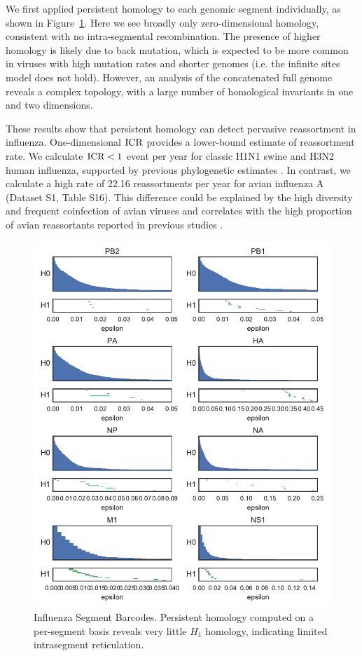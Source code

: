 We first applied persistent homology to each genomic segment individually, as shown in Figure~\ref{fig:flu:segment_barcodes}.
Here we see broadly only zero-dimensional homology, consistent with no intra-segmental recombination.
The presence of higher homology is likely due to back mutation, which is expected to be more common in viruses with high mutation rates and shorter genomes (i.e. the infinite sites model does not hold).
However, an analysis of the concatenated full genome reveals a complex topology, with a large number of homological invariants in one and two dimensions.

These results show that persistent homology can detect pervasive reassortment in influenza.
One-dimensional $\operatorname{ICR}$ provides a lower-bound estimate of reassortment rate.
We calculate $\operatorname{ICR} < 1$ event per year for classic H1N1 swine and H3N2 human influenza, supported by previous phylogenetic estimates \cite{Lycett:2012fqa,Holmes:2005cia}.
In contrast, we calculate a high rate of 22.16 reassortments per year for avian influenza A (Dataset S1, Table S16).
This difference could be explained by the high diversity and frequent coinfection of avian viruses \cite{Lubeck:1979ws} and correlates with the high proportion of avian reassortants reported in previous studies \cite{Dugan:2008iba}.

\begin{figure}
\centering
\includegraphics[]{fig/influenza/flu_segment_barcodes.pdf}
\caption[Influenza Segment Barcodes]{Influenza Segment Barcodes. Persistent homology computed on a per-segment basis reveals very little $H_1$ homology, indicating limited intrasegment reticulation.}
\label{fig:flu:segment_barcodes}
\end{figure}

